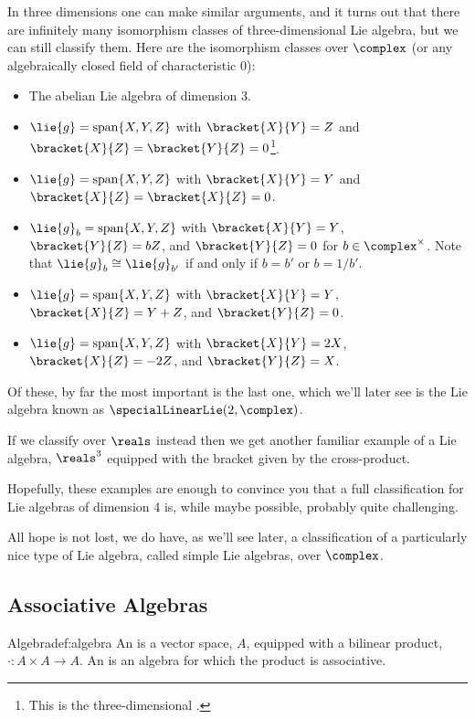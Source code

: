 \documentclass[fleqn]{NotesClass}
\newcommand{\isomorphic}{\cong}
\DeclareMathOperator{\Span}{span}
\begin{document}
    In three dimensions one can make similar arguments, and it turns out that there are infinitely many isomorphism classes of three-dimensional Lie algebra, but we can still classify them.
    Here are the isomorphism classes over \(\complex\) (or any algebraically closed field of characteristic 0):
    \begin{itemize}
        \item The abelian Lie algebra of dimension 3.
        \item \(\lie{g} = \Span\{X, Y, Z\}\) with \(\bracket{X}{Y} = Z\) and \(\bracket{X}{Z} = \bracket{Y}{Z} = 0\)\footnote{This is the three-dimensional .}.
        \item \(\lie{g} = \Span\{X, Y, Z\}\) with \(\bracket{X}{Y} = Y\) and \(\bracket{X}{Z} = \bracket{X}{Z} = 0\).
        \item \(\lie{g}_b = \Span\{X, Y, Z\}\) with \(\bracket{X}{Y} = Y\), \(\bracket{Y}{Z} = bZ\), and \(\bracket{Y}{Z} = 0\) for \(b \in \complex^{\times}\).
        Note that \(\lie{g}_b \isomorphic \lie{g}_{b'}\) if and only if \(b = b'\) or \(b = 1/b'\).
        \item \(\lie{g} = \Span\{X, Y, Z\}\) with \(\bracket{X}{Y} = Y\), \(\bracket{X}{Z} = Y + Z\), and \(\bracket{Y}{Z} = 0\).
        \item \(\lie{g} = \Span\{X, Y, Z\}\) with \(\bracket{X}{Y} = 2X\), \(\bracket{X}{Z} = -2Z\), and \(\bracket{Y}{Z} = X\).
    \end{itemize}
    Of these, by far the most important is the last one, which we'll later see is the Lie algebra known as \(\specialLinearLie(2, \complex)\).
    
    If we classify over \(\reals\) instead then we get another familiar example of a Lie algebra, \(\reals^3\) equipped with the bracket given by the cross-product.
    
    Hopefully, these examples are enough to convince you that a full classification for Lie algebras of dimension 4 is, while maybe possible, probably quite challenging.
    
    All hope is not lost, we do have, as we'll see later, a classification of a particularly nice type of Lie algebra, called simple Lie algebras, over \(\complex\).
    
    \subsection{Associative Algebras}
    \begin{dfn}{Algebra}{def:algebra}
        An  is a vector space, \(A\), equipped with a bilinear product, \(\cdot \colon A \times A \to A\).
        An  is an algebra for which the product is associative.
    \end{dfn}
    
\end{document}
